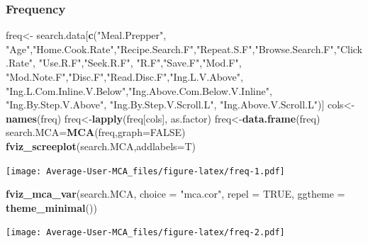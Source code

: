 \documentclass[
]{article}
\newenvironment{Shaded}{\begin{snugshade}}{\end{snugshade}}
\newcommand{\DataTypeTok}[1]{\textcolor[rgb]{0.13,0.29,0.53}{#1}}
\newcommand{\KeywordTok}[1]{\textcolor[rgb]{0.13,0.29,0.53}{\textbf{#1}}}
\newcommand{\NormalTok}[1]{#1}
\newcommand{\OtherTok}[1]{\textcolor[rgb]{0.56,0.35,0.01}{#1}}
\newcommand{\StringTok}[1]{\textcolor[rgb]{0.31,0.60,0.02}{#1}}
\begin{document}
\hypertarget{frequency}{%
\subsubsection{Frequency}\label{frequency}}

\begin{Shaded}
\begin{Highlighting}[]
\NormalTok{freq<-}\StringTok{ }\NormalTok{search.data[}\KeywordTok{c}\NormalTok{(}\StringTok{"Meal.Prepper"}\NormalTok{, }\StringTok{"Age"}\NormalTok{,}\StringTok{"Home.Cook.Rate"}\NormalTok{,}\StringTok{"Recipe.Search.F"}\NormalTok{,}\StringTok{"Repeat.S.F"}\NormalTok{,}\StringTok{"Browse.Search.F"}\NormalTok{,}\StringTok{"Click.Rate"}\NormalTok{,}
            \StringTok{"Use.R.F"}\NormalTok{,}\StringTok{"Seek.R.F"}\NormalTok{, }\StringTok{"R.F"}\NormalTok{,}\StringTok{"Save.F"}\NormalTok{,}\StringTok{"Mod.F"}\NormalTok{, }\StringTok{"Mod.Note.F"}\NormalTok{,}\StringTok{"Disc.F"}\NormalTok{,}\StringTok{"Read.Disc.F"}\NormalTok{,}\StringTok{"Ing.L.V.Above"}\NormalTok{,}
            \StringTok{"Ing.L.Com.Inline.V.Below"}\NormalTok{,}\StringTok{"Ing.Above.Com.Below.V.Inline"}\NormalTok{,  }\StringTok{"Ing.By.Step.V.Above"}\NormalTok{,  }\StringTok{"Ing.By.Step.V.Scroll.L"}\NormalTok{,}
            \StringTok{"Ing.Above.V.Scroll.L"}\NormalTok{)]}
\NormalTok{cols<-}\KeywordTok{names}\NormalTok{(freq)}
\NormalTok{freq<-}\KeywordTok{lapply}\NormalTok{(freq[cols], as.factor)}
\NormalTok{freq<-}\KeywordTok{data.frame}\NormalTok{(freq)}
\NormalTok{search.MCA=}\KeywordTok{MCA}\NormalTok{(freq,}\DataTypeTok{graph=}\OtherTok{FALSE}\NormalTok{)}
\KeywordTok{fviz_screeplot}\NormalTok{(search.MCA,}\DataTypeTok{addlabels=}\NormalTok{T)}
\end{Highlighting}
\end{Shaded}

\texttt{[image: Average-User-MCA\_files/figure-latex/freq-1.pdf]}

\begin{Shaded}
\begin{Highlighting}[]
\KeywordTok{fviz_mca_var}\NormalTok{(search.MCA, }\DataTypeTok{choice =} \StringTok{"mca.cor"}\NormalTok{, }\DataTypeTok{repel =} \OtherTok{TRUE}\NormalTok{,}
             \DataTypeTok{ggtheme =} \KeywordTok{theme_minimal}\NormalTok{())}
\end{Highlighting}
\end{Shaded}

\texttt{[image: Average-User-MCA\_files/figure-latex/freq-2.pdf]}
\end{document}
